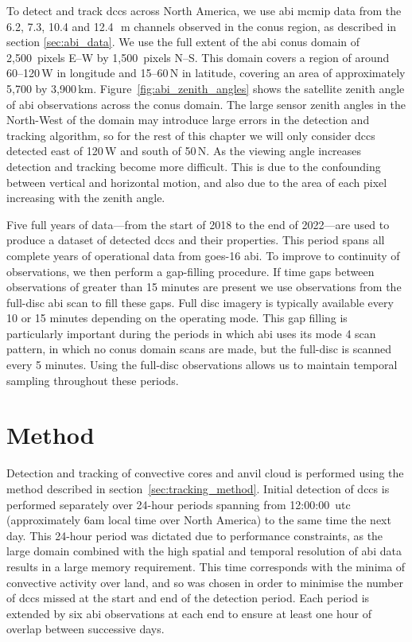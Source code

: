 To detect and track \acrshort{dcc}s across North America, we use \acrshort{abi} \acrshort{mcmip} data from the 6.2, 7.3, 10.4 and 12.4\,\unit{\mu m} channels observed in the \acrshort{conus} region, as described in section \ref{sec:abi_data}.
We use the full extent of the \acrshort{abi} \acrshort{conus} domain of 2,500~pixels E--W by 1,500~pixels N--S.
This domain covers a region of around 60--120\,\textdegree W in longitude and 15--60\,\textdegree N in latitude, covering an area of approximately 5,700 by 3,900\,\unit{km}.
Figure~\ref{fig:abi_zenith_angles} shows the satellite zenith angle of \acrshort{abi} observations across the \acrshort{conus} domain.
The large sensor zenith angles in the North-West of the domain may introduce large errors in the detection and tracking algorithm, so for the rest of this chapter we will only consider \acrshort{dcc}s detected east of 120\,\textdegree W and south of 50\,\textdegree N.
As the viewing angle increases detection and tracking become more difficult.
This is due to the confounding between vertical and horizontal motion, and also due to the area of each pixel increasing with the zenith angle.

Five full years of data---from the start of 2018 to the end of 2022---are used to produce a dataset of detected \acrshort{dcc}s and their properties.
This period spans all complete years of operational data from \acrshort{goes}-16 \acrshort{abi}.
To improve to continuity of observations, we then perform a gap-filling procedure.
If time gaps between observations of greater than 15 minutes are present we use observations from the full-disc \acrshort{abi} scan to fill these gaps.
Full disc imagery is typically available every 10 or 15 minutes depending on the operating mode.
This gap filling is particularly important during the periods in which \acrshort{abi} uses its mode 4 scan pattern, in which no \acrshort{conus} domain scans are made, but the full-disc is scanned every 5 minutes.
Using the full-disc observations allows us to maintain temporal sampling throughout these periods.


\section{Method}

Detection and tracking of convective cores and anvil cloud is performed using the method described in section~\ref{sec:tracking_method}.
Initial detection of \acrshort{dcc}s is performed separately over 24-hour periods spanning from 12:00:00~\acrshort{utc} (approximately 6am local time over North America) to the same time the next day.
This 24-hour period was dictated due to performance constraints, as the large domain combined with the high spatial and temporal resolution of \acrshort{abi} data results in a large memory requirement.
This time corresponds with the minima of convective activity over land, and so was chosen in order to minimise the number of \acrshort{dcc}s missed at the start and end of the detection period.
Each period is extended by six \acrshort{abi} observations at each end to ensure at least one hour of overlap between successive days.

